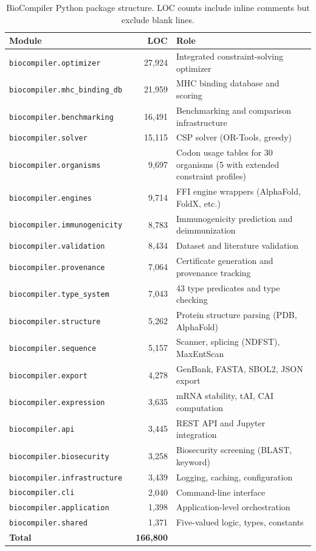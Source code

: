 \begin{table}[!htbp]
\centering
\caption{BioCompiler Python package structure. LOC counts include
         inline comments but exclude blank lines.}
\label{tab:packageloc}
\begin{tabular}{lrp{4.2cm}}
\toprule
\textbf{Module} & \textbf{LOC} & \textbf{Role} \\
\midrule
\texttt{biocompiler.optimizer}        & 27,924 & Integrated constraint-solving optimizer \\
\texttt{biocompiler.mhc\_binding\_db}   & 21,959 & MHC binding database and scoring \\
\texttt{biocompiler.benchmarking}     & 16,491 & Benchmarking and comparison infrastructure \\
\texttt{biocompiler.solver}           & 15,115 & CSP solver (OR-Tools, greedy) \\
\texttt{biocompiler.organisms}        &  9,697 & Codon usage tables for 30 organisms (5 with extended constraint profiles) \\
\texttt{biocompiler.engines}          &  9,714 & FFI engine wrappers (AlphaFold, FoldX, etc.) \\
\texttt{biocompiler.immunogenicity}  &  8,783 & Immunogenicity prediction and deimmunization \\
\texttt{biocompiler.validation}       &  8,434 & Dataset and literature validation \\
\texttt{biocompiler.provenance}       &  7,064 & Certificate generation and provenance tracking \\
\texttt{biocompiler.type\_system}      &  7,043 & 43 type predicates and type checking \\
\texttt{biocompiler.structure}        &  5,262 & Protein structure parsing (PDB, AlphaFold) \\
\texttt{biocompiler.sequence}        &  5,157 & Scanner, splicing (NDFST), MaxEntScan \\
\texttt{biocompiler.export}           &  4,278 & GenBank, FASTA, SBOL2, JSON export \\
\texttt{biocompiler.expression}       &  3,635 & mRNA stability, tAI, CAI computation \\
\texttt{biocompiler.api}              &  3,445 & REST API and Jupyter integration \\
\texttt{biocompiler.biosecurity}      &  3,258 & Biosecurity screening (BLAST, keyword) \\
\texttt{biocompiler.infrastructure}  &  3,439 & Logging, caching, configuration \\
\texttt{biocompiler.cli}              &  2,040 & Command-line interface \\
\texttt{biocompiler.application}      &  1,398 & Application-level orchestration \\
\texttt{biocompiler.shared}           &  1,371 & Five-valued logic, types, constants \\
\midrule
\textbf{Total}                        & \textbf{~166,800} & \\
\bottomrule
\end{tabular}
\end{table}

